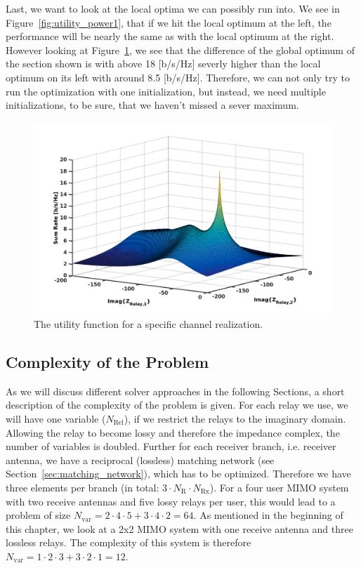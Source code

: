 Last, we want to look at the local optima we can possibly run into.
We see in Figure~\ref{fig:utility_power1}, that if we hit the local optimum at the left, the performance will be nearly the same as with the local optimum at the right.
However looking at Figure~\ref{fig:utility_power4}, we see that the difference of the global optimum of the section shown is with above 18 [b/s/Hz] severly higher than the local optimum on its left with around 8.5 [b/s/Hz].
Therefore, we can not only try to run the optimization with one initialization, but instead, we need multiple initializations, to be sure, that we haven't missed a sever maximum.
\begin{figure}[h]
\centering
  \includegraphics[width=0.8\linewidth]{images/full_mesh_highsnr_94.png}
\caption{The utility function for a specific channel realization.}
\label{fig:utility_power4}
\end{figure}

\subsection{Complexity of the Problem}
\label{sec:}

As we will discuss different solver approaches in the following Sections, a short description of the complexity of the problem is given.
For each relay we use, we will have one variable ($N_\text{Rel}$), if we restrict the relays to the imaginary domain.
Allowing the relay to become lossy and therefore the impedance complex, the number of variables is doubled.%
Further for each receiver branch, i.e. receiver antenna, we have a reciprocal (lossless) matching network (see Section~\ref{sec:matching_network}), which has to be optimized.
Therefore we have three elements per branch (in total: $3\cdot N_\text{R}\cdot N_\text{Rx}$).
For a four user MIMO system with two receive antennas and five lossy relays per user, this would lead to a problem of size $N_\text{var} =  2\cdot 4\cdot 5 + 3\cdot 4\cdot 2 = 64$.
As mentioned in the beginning of this chapter, we look at a 2x2 MIMO system with one receive antenna and three lossless relays.
The complexity of this system is therefore $N_\text{var} =  1\cdot 2\cdot 3 + 3\cdot 2\cdot 1 = 12$.

